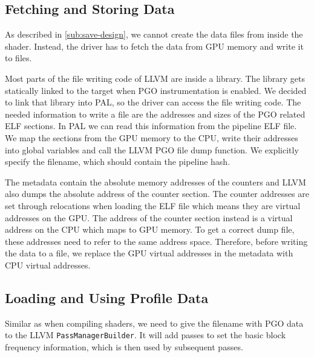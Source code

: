 
\subsection{Fetching and Storing Data}
\label{sub:save}
As described in \cref{sub:save-design}, we cannot create the data files from inside the shader. Instead, the driver has to fetch the data from GPU memory and write it to files.

Most parts of the file writing code of LLVM are inside a library. The library gets statically linked to the target when PGO instrumentation is enabled. We decided to link that library into PAL, so the driver can access the file writing code.
The needed information to write a file are the addresses and sizes of the PGO related ELF sections. In PAL we can read this information from the pipeline ELF file. We map the sections from the GPU memory to the CPU, write their addresses into global variables and call the LLVM PGO file dump function.
We explicitly specify the filename, which should contain the pipeline hash.

The metadata contain the absolute memory addresses of the counters and LLVM also dumps the absolute address of the counter section. The counter addresses are set through relocations when loading the ELF file which means they are virtual addresses on the GPU. The address of the counter section instead is a virtual address on the CPU which maps to GPU memory. To get a correct dump file, these addresses need to refer to the same address space. Therefore, before writing the data to a file, we replace the GPU virtual addresses in the metadata with CPU virtual addresses.

\subsection{Loading and Using Profile Data}
\label{sub:load}
Similar as when compiling shaders, we need to give the filename with PGO data to the LLVM \texttt{PassManagerBuilder}. It will add passes to set the basic block frequency information, which is then used by subsequent passes.

